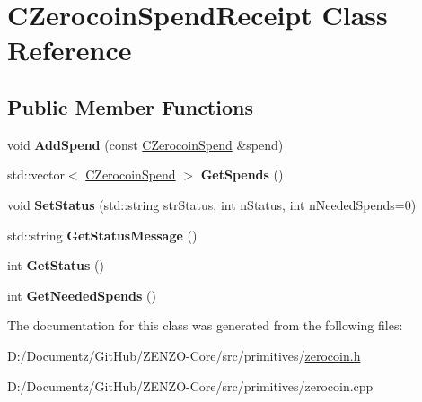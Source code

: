 \hypertarget{class_c_zerocoin_spend_receipt}{}\section{C\+Zerocoin\+Spend\+Receipt Class Reference}
\label{class_c_zerocoin_spend_receipt}
\subsection*{Public Member Functions}
\begin{DoxyCompactItemize}
\item 
\mbox{\label{class_c_zerocoin_spend_receipt_a1f90eb105cda7710a73155152a47bc3f}} 
void {\bfseries Add\+Spend} (const \mbox{\hyperlink{class_c_zerocoin_spend}{C\+Zerocoin\+Spend}} \&spend)
\item 
\mbox{\label{class_c_zerocoin_spend_receipt_a4baa56bcb6fb34fa67e1bad32036ca91}} 
std\+::vector$<$ \mbox{\hyperlink{class_c_zerocoin_spend}{C\+Zerocoin\+Spend}} $>$ {\bfseries Get\+Spends} ()
\item 
\mbox{\label{class_c_zerocoin_spend_receipt_af1ab82e92b9dea235c7ccbad660be7ba}} 
void {\bfseries Set\+Status} (std\+::string str\+Status, int n\+Status, int n\+Needed\+Spends=0)
\item 
\mbox{\label{class_c_zerocoin_spend_receipt_a165f5aa949e97e47ab7007a1d2c4b1bb}} 
std\+::string {\bfseries Get\+Status\+Message} ()
\item 
\mbox{\label{class_c_zerocoin_spend_receipt_a12432383fc7558ad8192c607cab4c715}} 
int {\bfseries Get\+Status} ()
\item 
\mbox{\label{class_c_zerocoin_spend_receipt_acf2523b9f1e65f04a9554a8bab1df554}} 
int {\bfseries Get\+Needed\+Spends} ()
\end{DoxyCompactItemize}


The documentation for this class was generated from the following files\+:\begin{DoxyCompactItemize}
\item 
D\+:/\+Documentz/\+Git\+Hub/\+Z\+E\+N\+Z\+O-\/\+Core/src/primitives/\mbox{\hyperlink{zerocoin_8h}{zerocoin.\+h}}\item 
D\+:/\+Documentz/\+Git\+Hub/\+Z\+E\+N\+Z\+O-\/\+Core/src/primitives/zerocoin.\+cpp\end{DoxyCompactItemize}
